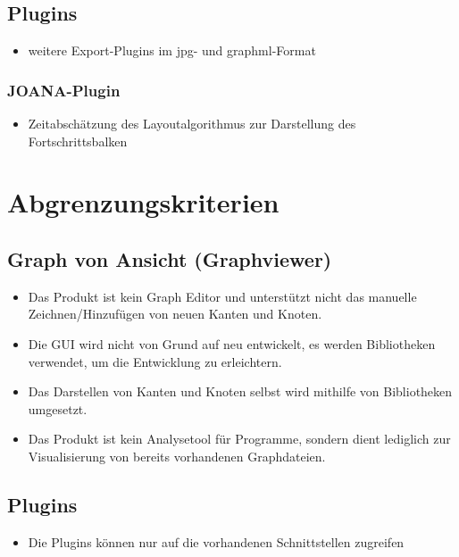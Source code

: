 \subsection{Plugins}
  \begin{itemize}
    \item weitere Export-Plugins im \gls{jpg}- und \gls{graphml}-Format
  \end{itemize}
  
  \subsubsection{JOANA-Plugin}
  \begin{itemize}
    \item Zeitabschätzung des Layoutalgorithmus zur Darstellung des Fortschrittsbalken
  \end{itemize}


\section{Abgrenzungskriterien}

\subsection{Graph von Ansicht (Graphviewer)}
  \begin{itemize}
    \item Das Produkt ist kein Graph Editor und unterstützt nicht das manuelle Zeichnen/Hinzufügen von neuen Kanten und Knoten.
    \item Die GUI wird nicht von Grund auf neu entwickelt, es werden Bibliotheken verwendet, um die Entwicklung zu erleichtern.
    \item Das Darstellen von Kanten und Knoten selbst wird mithilfe von Bibliotheken umgesetzt.
    \item Das Produkt ist kein Analysetool für Programme, sondern dient lediglich zur Visualisierung von bereits vorhandenen Graphdateien.
  \end{itemize}
\subsection{Plugins}
  \begin{itemize}
    \item Die Plugins können nur auf die vorhandenen Schnittstellen zugreifen %
  \end{itemize}
